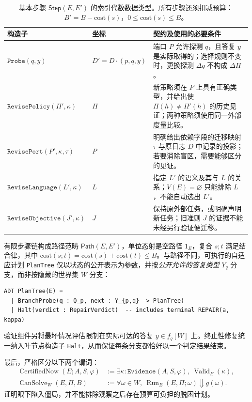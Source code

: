 \documentclass[11pt,a4paper]{article}
\theoremstyle{preprintthm}
\theoremstyle{preprintdef}
\newcommand{\Valid}{\operatorname{Valid}}
\begin{document}
\begin{table}[!htbp]
\centering
\caption{基本步骤 $\mathsf{Step}(E,E')$ 的索引代数数据类型。所有步骤还须扣减预算：$B'=B-\mathrm{cost}(s)$，$0\le\mathrm{cost}(s)\le B$。}
\label{tab:steps}
\footnotesize
\begin{tabularx}{\linewidth}{@{}l l >{\raggedright\arraybackslash}X@{}}
\toprule
\textbf{构造子} & \textbf{坐标} & \textbf{契约及使用的必要条件} \\
\midrule
$\texttt{Probe}(q,y)$ & $D'\!=\!D\cdot(p,q,y)$ & 端口 $P$ 允许探测 $q$，且答复 $y$ 是实际取得的；选择规则不变时，更换探测 $\Delta q$ 不构成 $\Delta\Pi$。 \\
$\texttt{RevisePolicy}(\Pi',\kappa)$ & $\Pi$ & 新策略须在 $P$ 上具有正确类型，并给出使 $\Pi(h)\ne\Pi'(h)$ 的历史见证；两种策略须使用同一外部度量比较。 \\
$\texttt{RevisePort}(P',\kappa,\tau)$ & $P$ & 明确给出依赖字段的迁移映射 $\tau$ 与原日志 $D$ 中记录的投影；若要消除盲区，需要能够区分的见证。 \\
$\texttt{ReviseLanguage}(L',\kappa)$ & $L$ & 指定 $L'$ 的语义及其与 $L$ 的关系；$V(E)=\varnothing$ 只能排除 $L$，不能自动选出 $L'$。 \\
$\texttt{ReviseObjective}(J',\kappa)$ & $J$ & 保持原外部任务，或明确声明新任务；旧准则 $J$ 的证据不能未经另行验证便迁移。 \\
\bottomrule
\end{tabularx}
\end{table}

有限步骤链构成路径范畴 $\mathsf{Path}(E,E')$，单位态射是空路径 $1_E$，复合 $s;t$ 满足结合律，其中 $\mathrm{cost}(s;t)=\mathrm{cost}(s)+\mathrm{cost}(t)\le B$。与路径不同，可执行的自适应计划 \texttt{PlanTree} 仅以状态的公开表示为参数，并按\emph{公开允许的答复类型} $Y_q$ 分支，而非按隐藏的世界集 $W$ 分支：
\begin{lstlisting}[caption={自适应计划树的安全契约：不泄露隐藏的世界空间 $W$。}]
ADT PlanTree(E) =
  | BranchProbe(q : Q_p, next : Y_{p,q} -> PlanTree)
  | Halt(verdict : RepairVerdict)  -- includes terminal REPAIR(a, kappa)
\end{lstlisting}
验证组件另将最坏情况评估限制在实际可达的答复 $y\in f_q[W]$ 上。终止性修复统一纳入叶节点构造子 \texttt{Halt}，从而保证每条分支都恰好以一个判定结果结束。

最后，严格区分以下两个谓词：
\begin{equation}
  \begin{aligned}
    \operatorname{CertifiedNow}(E;A,S,\varphi) &:= \exists\kappa:\texttt{Evidence}(A,S,\varphi),\ \Valid_E(\kappa),\\
    \operatorname{CanSolve}_W(E,\Pi,B) &:= \forall\omega\in W,\ \operatorname{Run}_B(E,\Pi;\omega)\Downarrow g(\omega).
  \end{aligned}
\end{equation}
证明眼下陷入僵局，并不能排除观察之后存在预算可负担的脱困计划。
\end{document}
